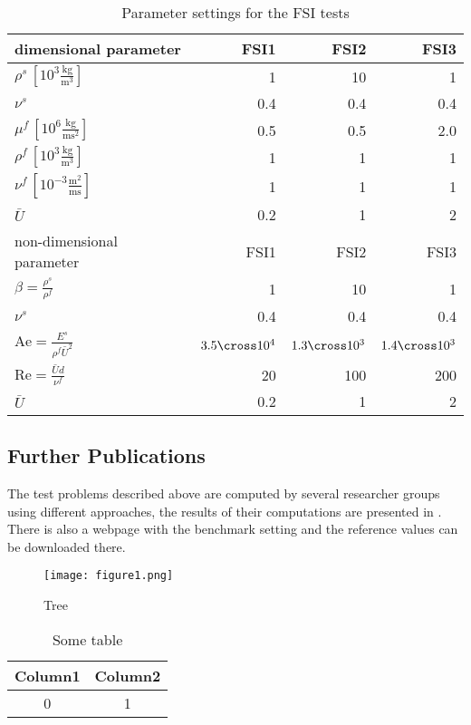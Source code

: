 \begin{table}\label{table:CSM_constants}
\centering
\begin{tabular}{|l|r|r|r|}
  \hline
  dimensional parameter                               & FSI1 & FSI2 & FSI3 \\
  \hline
  $\rho^s\,[10^3 \frac{\mathrm{kg}}{\mathrm{m}^3}]$   &    1 &   10 &    1 \\
  $\nu^s$                                             &  0.4 &  0.4 &  0.4 \\
  $\mu^f\,[10^{6} \frac{\mathrm{kg}}{\mathrm{ms}^2}]$ &  0.5 &  0.5 &  2.0 \\
  \hline
  $\rho^f\,[10^3 \frac{\mathrm{kg}}{\mathrm{m}^3}]$   &    1 &    1 &    1 \\
  $\nu^f\,[10^{-3} \frac{\mathrm{m}^2}{\mathrm{ms}}]$ &    1 &    1 &    1 \\
  \hline
  $\bar{U}$                                           & 0.2  &    1 &    2 \\
  \hline \hline
  non-dimensional parameter                           & FSI1 & FSI2 & FSI3 \\
  \hline
  $\beta = \frac{\rho^s}{\rho^f}$                     &    1 &   10 &    1 \\
  $\nu^s$                                             &  0.4 &  0.4 &  0.4 \\
  $\mathrm{Ae} = \frac{E^s}{\rho^f\bar{U}^2}$ & $3.5\cross10^4$ &  $1.3\cross10^3$ &  $1.4\cross10^3$ \\
  \hline
  $\mathrm{Re} = \frac{\bar{U}d}{\nu^f}$              &   20 &  100 &  200 \\
  $\bar{U}$                                           & 0.2  &    1 &    2 \\
  \hline
\end{tabular}
  \caption{Parameter settings for the FSI tests}
\end{table}


\subsection{Further Publications}
The test problems described above are computed by several researcher groups using different 
approaches, the results of their computations are presented in \cite{TurekHronRazzaqSchaefer2010}.
There is also a webpage \cite{featflow} with the benchmark setting and 
the reference values can be downloaded there.




\begin{figure}[h]%
 	\begin{center}%
 		\texttt{[image: figure1.png]}%
 		\caption{Tree}\label{fig:baum}%
 	\end{center}%
\end{figure}

\begin{table}[h]%
 	\begin{center}%
		\caption{Some table}\label{tab:example}%
	 	\begin{tabular}{c|c}%
 			Column1 & Column2\\
 			\hline
 			0 & 1\\
 		\end{tabular}%
 	\end{center}%
\end{table}
